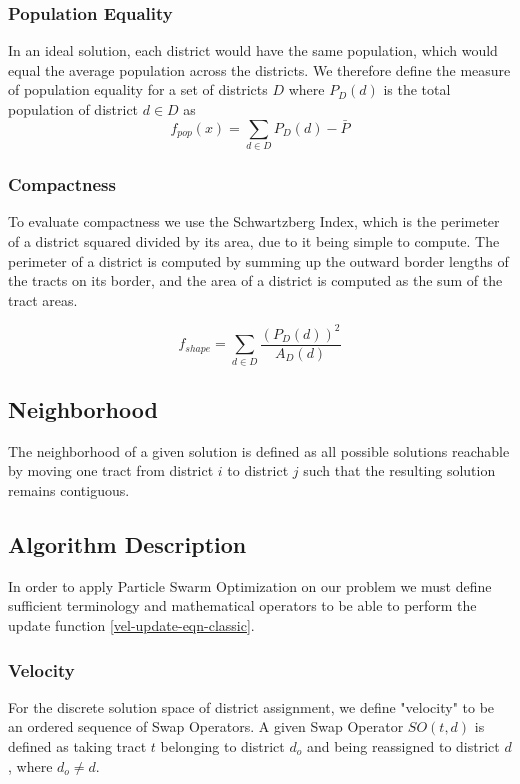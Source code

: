 \documentclass[journal]{IEEEtran}
\begin{document}
\subsubsection{Population Equality}
In an ideal solution, each district would have the same population, which would
equal the average population across the districts.  We therefore define the
measure of population equality for a set of districts $D$ where $P_D(d)$ is the
total population of district $d \in D$ as
$$f_{pop}(x) = \sum_{d \in D} P_D(d) - \bar{P}$$

\subsubsection{Compactness}
To evaluate compactness we use the Schwartzberg Index\cite{schwartzberg}, which
is the perimeter of a district squared divided by its area, due to it being
simple to compute.  The perimeter of a district is computed by summing up the
outward border lengths of the tracts on its border, and the area of a district
is computed as the sum of the tract areas.

$$f_{shape} = \sum_{d \in D} \frac{(P_D(d))^2}{A_D(d)}$$

\subsection{Neighborhood}
The neighborhood of a given solution is defined as all possible solutions
reachable by moving one tract from district $i$ to district $j$ such that the
resulting solution remains contiguous.


\subsection{Algorithm Description}
In order to apply Particle Swarm Optimization on our problem we must define
sufficient terminology and mathematical operators to be able to perform the
update function \ref{vel-update-eqn-classic}.\\

\subsubsection{Velocity}
For the discrete solution space of district assignment, we define "velocity" to
be an ordered sequence of Swap Operators.  A given Swap Operator $SO(t, d)$ is
defined as taking tract $t$ belonging to district $d_o$ and being reassigned to
district $d$, where $d_o \neq d$.\\
\end{document}
